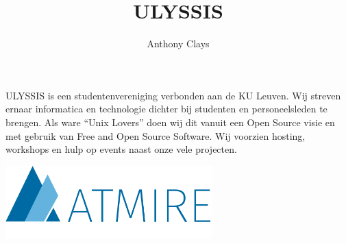 \documentclass[11pt]{article}
\title{ULYSSIS}
\author{Anthony Clays}
\begin{document}
\maketitle

ULYSSIS is een studentenvereniging verbonden aan de KU Leuven.
Wij streven ernaar informatica en technologie dichter bij studenten en personeelsleden te brengen.
Als ware ``Unix Lovers'' doen wij dit vanuit een Open Source visie en met gebruik van Free and Open Source Software.
Wij voorzien hosting, workshops en hulp op events naast onze vele projecten.

\includegraphics[width=0.6\textwidth]{atmire.png}
\end{document}

